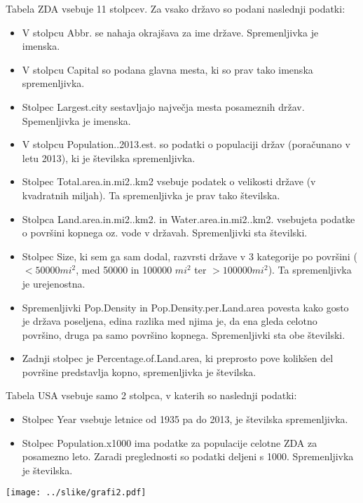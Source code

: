\documentclass[11pt,a4paper]{article}
\begin{document}
\pagebreak 

Tabela ZDA vsebuje 11 stolpcev. Za vsako državo so podani naslednji podatki:

\begin{itemize}
  \item V stolpcu Abbr. se nahaja okrajšava za ime države. Spremenljivka je imenska.
  \item V stolpcu Capital so podana glavna mesta, ki so prav tako imenska spremenljivka.
  \item Stolpec Largest.city sestavljajo največja mesta posameznih držav. Spemenljivka je imenska.
  \item V stolpcu Population..2013.est. so podatki o populaciji držav (poračunano v letu 2013), ki je številska spremenljivka.
  \item Stolpec Total.area.in.mi2..km2 vsebuje podatek o velikosti države (v kvadratnih miljah). Ta spremenljivka je prav tako številska.
  \item Stolpca Land.area.in.mi2..km2. in Water.area.in.mi2..km2. vsebujeta podatke o površini kopnega oz. vode v državah. Spremenljivki sta številski.
  \item Stolpec Size, ki sem ga sam dodal, razvrsti države v 3 kategorije po površini ($<50000 mi^2$, med 50000 in 100000 $mi^2$ ter $>100000 mi^2$). Ta spremenljivka je urejenostna.
  \item Spremenljivki Pop.Density in Pop.Density.per.Land.area povesta kako gosto je država poseljena, edina razlika med njima je, da ena gleda celotno površino, druga pa samo površino kopnega. Spremenljivki sta obe številski.
  \item Zadnji stolpec je Percentage.of.Land.area, ki preprosto pove kolikšen del površine predstavlja kopno, spremenljivka je številska.
\end{itemize}

Tabela USA vsebuje samo 2 stolpca, v katerih so naslednji podatki:

\begin{itemize}
  \item Stolpec Year vsebuje letnice od 1935 pa do 2013, je številska spremenljivka.
  \item Stolpec Population.x1000 ima podatke za populacije celotne ZDA za posamezno leto. Zaradi preglednosti so podatki deljeni s 1000. Spremenljivka je številska.
\end{itemize}

\pagebreak

\texttt{[image: ../slike/grafi2.pdf]}
\end{document}
